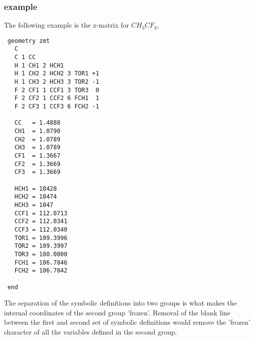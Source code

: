 \subsubsection*{example}

The following example is the z-matrix for $CH_3CF_3$,


\begin{verbatim}
 geometry zmt
   C 
   C 1 CC 
   H 1 CH1 2 HCH1 
   H 1 CH2 2 HCH2 3 TOR1 +1 
   H 1 CH3 2 HCH3 3 TOR2 -1 
   F 2 CF1 1 CCF1 3 TOR3  0 
   F 2 CF2 1 CCF2 6 FCH1  1 
   F 2 CF3 1 CCF3 6 FCH2 -1

   CC   = 1.4888 
   CH1  = 1.0790 
   CH2  = 1.0789  
   CH3  = 1.0789  
   CF1  = 1.3667 
   CF2  = 1.3669 
   CF3  = 1.3669

   HCH1 = 10428 
   HCH2 = 10474 
   HCH3 = 1047 
   CCF1 = 112.0713 
   CCF2 = 112.0341 
   CCF3 = 112.0340 
   TOR1 = 109.3996 
   TOR2 = 109.3997 
   TOR3 = 180.0000 
   FCH1 = 106.7846 
   FCH2 = 106.7842

 end   
\end{verbatim}

   The  separation  of the symbolic definitions into two groups is what
   makes the internal coordinates of the second group 'frozen'.
   Removal  of  the blank  line between the first and second set of
   symbolic definitions would remove the 'frozen' character of all the
   variables defined in  the  second group.

